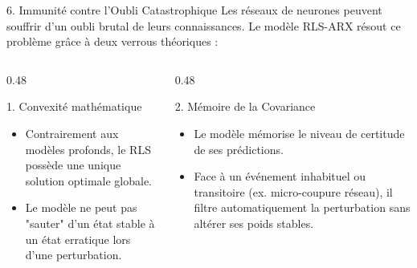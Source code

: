 \documentclass[10pt,aspectratio=169]{beamer}
\begin{document}
\begin{frame}{6. Immunité contre l'Oubli Catastrophique}
  Les réseaux de neurones peuvent souffrir d'un oubli brutal de leurs connaissances. Le modèle RLS-ARX résout ce problème grâce à deux verrous théoriques :
  
  \vspace{0.5em}
  \begin{columns}[T]
    \begin{column}{0.48\textwidth}
      \begin{block}{1. Convexité mathématique}
        \begin{itemize}
          \item Contrairement aux modèles profonds, le RLS possède une unique solution optimale globale. 
          \item Le modèle ne peut pas "sauter" d'un état stable à un état erratique lors d'une perturbation.
        \end{itemize}
      \end{block}
    \end{column}
    
    \begin{column}{0.48\textwidth}
      \begin{block}{2. Mémoire de la Covariance}
        \begin{itemize}
          \item Le modèle mémorise le niveau de certitude de ses prédictions.
          \item Face à un événement inhabituel ou transitoire (ex. micro-coupure réseau), il filtre automatiquement la perturbation sans altérer ses poids stables.
        \end{itemize}
      \end{block}
    \end{column}
  \end{columns}
\end{frame}
\end{document}

